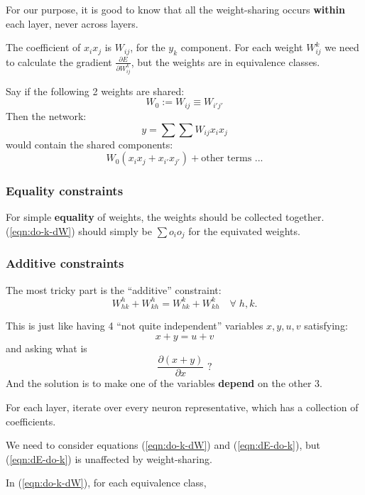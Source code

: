 For our purpose, it is good to know that all the weight-sharing occurs \textbf{within} each layer, never across layers.

The coefficient of $x_i x_j$ is $W_{i j}$, for the $y_k$ component.  For each weight $W_{ij}^k$ we need to calculate the gradient $\displaystyle \frac{\partial E}{\partial W_{ij}^k}$, but the weights are in equivalence classes.

Say if the following 2 weights are shared:
\begin{equation}
W_0 := W_{i j} \equiv W_{i' j'}
\end{equation}
Then the network:
\begin{equation}
y = \sum \sum W_{ij} x_i x_j
\end{equation}
would contain the shared components:
\begin{equation}
W_0 ( x_i x_j + x_{i'} x_{j'} ) + \mbox{other terms ...}
\end{equation}

\subsubsection{Equality constraints}

For simple \textbf{equality} of weights, the weights should be collected together.  (\ref{eqn:do-k-dW}) should simply be $\sum o_i o_j$ for the equivated weights.

\subsubsection{Additive constraints}

The most tricky part is the ``additive'' constraint:
\begin{equation}
W_{hk}^h + W_{kh}^h = W_{hk}^k + W_{kh}^k \quad \forall \; h,k .
\end{equation}

This is just like having 4 ``not quite independent'' variables $x, y, u, v$ satisfying:
\begin{equation}
x + y = u + v
\end{equation}
and asking what is
\begin{equation}
\frac{\partial (x + y)}{\partial x} \mbox{ ?}
\end{equation}
And the solution is to make one of the variables \textbf{depend} on the other 3.

For each layer, iterate over every neuron representative, which has a collection of coefficients.

We need to consider equations (\ref{eqn:do-k-dW}) and (\ref{eqn:dE-do-k}), but (\ref{eqn:dE-do-k}) is unaffected by weight-sharing.

In (\ref{eqn:do-k-dW}), for each equivalence class, 

